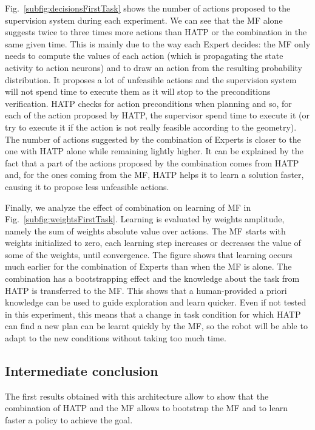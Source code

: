 \documentclass[english,a4paper,11pt,twoside]{StyleThese}
\begin{document}
Fig.~\ref{subfig:decisionsFirstTask} shows the number of actions proposed to the supervision system during each experiment. We can see that the MF alone suggests twice to three times more actions than HATP or the combination in the same given time. This is mainly due to the way each Expert decides: the MF only needs to compute the values of each action (which is propagating the state activity to action neurons) and to draw an action from the resulting probability distribution. It proposes a lot of unfeasible actions and the supervision system will not spend time to execute them as it will stop to the preconditions verification. HATP checks for action preconditions when planning and so, for each of the action proposed by HATP, the supervisor spend time to execute it (or try to execute it if the action is not really feasible according to the geometry). The number of actions suggested by the combination of Experts is closer to the one with HATP alone while remaining lightly higher. It can be explained by the fact that a part of the actions proposed by the combination comes from HATP and, for the ones coming from the MF, HATP helps it to learn a solution faster, causing it to propose less unfeasible actions.

Finally, we analyze the effect of combination on learning of MF in Fig.~\ref{subfig:weightsFirstTask}. Learning is evaluated by weights amplitude, namely the sum of weights absolute value over actions. The MF starts with weights initialized to zero, each learning step increases or decreases the value of some of the weights, until convergence. The figure shows that learning occurs much earlier for the combination of Experts than when the MF is alone. The combination has a bootstrapping effect and the knowledge about the task from HATP is transferred to the MF. This shows that a human-provided a priori knowledge can be used to guide exploration and learn quicker. Even if not tested in this experiment, this means that a change in task condition for which HATP can find a new plan can be learnt quickly by the MF, so the robot will be able to adapt to the new conditions without taking too much time.

\subsection{Intermediate conclusion}

The first results obtained with this architecture allow to show that the combination of HATP and the MF allows to bootstrap the MF and to learn faster a policy to achieve the goal.
\end{document}
